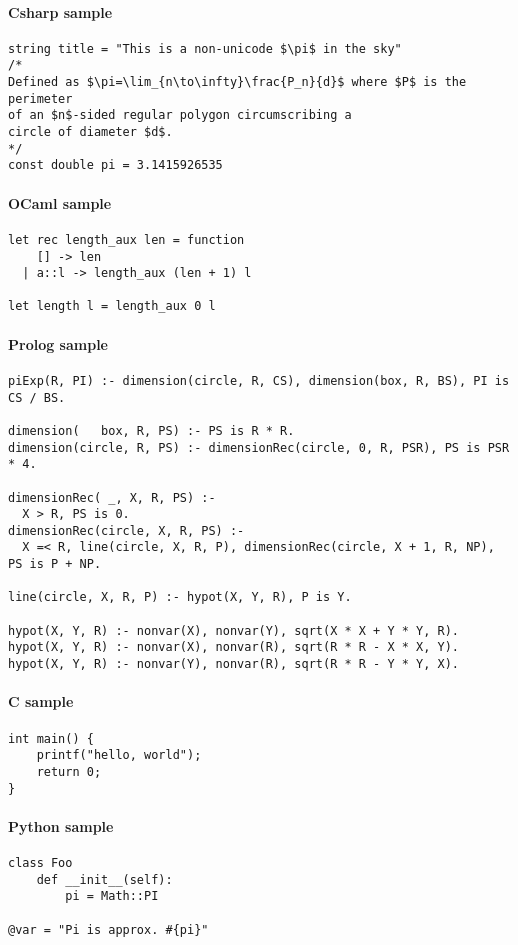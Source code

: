 \documentclass[langage=french,lecture=thpr]{ensldocument}
\begin{document}
\paragraph{Csharp sample}

\begin{verbatim}
string title = "This is a non-unicode $\pi$ in the sky"
/*
Defined as $\pi=\lim_{n\to\infty}\frac{P_n}{d}$ where $P$ is the perimeter
of an $n$-sided regular polygon circumscribing a
circle of diameter $d$.
*/
const double pi = 3.1415926535
\end{verbatim}

\paragraph{OCaml sample}

\begin{verbatim}
let rec length_aux len = function
    [] -> len
  | a::l -> length_aux (len + 1) l

let length l = length_aux 0 l
\end{verbatim}

\paragraph{Prolog sample}

\begin{verbatim}
piExp(R, PI) :- dimension(circle, R, CS), dimension(box, R, BS), PI is CS / BS.

dimension(   box, R, PS) :- PS is R * R.
dimension(circle, R, PS) :- dimensionRec(circle, 0, R, PSR), PS is PSR * 4.

dimensionRec( _, X, R, PS) :-
  X > R, PS is 0.
dimensionRec(circle, X, R, PS) :-
  X =< R, line(circle, X, R, P), dimensionRec(circle, X + 1, R, NP), PS is P + NP.

line(circle, X, R, P) :- hypot(X, Y, R), P is Y.

hypot(X, Y, R) :- nonvar(X), nonvar(Y), sqrt(X * X + Y * Y, R).
hypot(X, Y, R) :- nonvar(X), nonvar(R), sqrt(R * R - X * X, Y).
hypot(X, Y, R) :- nonvar(Y), nonvar(R), sqrt(R * R - Y * Y, X).
\end{verbatim}

\paragraph{C sample}

\begin{verbatim}
int main() {
    printf("hello, world");
    return 0;
}
\end{verbatim}

\paragraph{Python sample}

\begin{verbatim}
class Foo
    def __init__(self):
        pi = Math::PI

@var = "Pi is approx. #{pi}"
\end{verbatim}

\blinddocument
\end{document}
